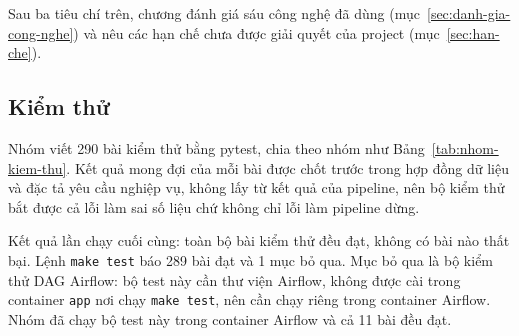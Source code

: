 Sau ba tiêu chí trên, chương đánh giá sáu công nghệ đã dùng (mục~\ref{sec:danh-gia-cong-nghe})
và nêu các hạn chế chưa được giải quyết của project (mục~\ref{sec:han-che}).

\subsection{Kiểm thử}
\label{sec:kiem-thu}

Nhóm viết 290 bài kiểm thử bằng pytest, chia theo nhóm như Bảng~\ref{tab:nhom-kiem-thu}. Kết quả
mong đợi của mỗi bài được chốt trước trong hợp đồng dữ liệu và đặc tả yêu cầu nghiệp vụ, không lấy từ kết
quả của pipeline, nên bộ kiểm thử bắt được cả lỗi làm sai số liệu chứ không chỉ lỗi làm pipeline
dừng.

Kết quả lần chạy cuối cùng: toàn bộ bài kiểm thử đều đạt, không có bài nào thất bại. Lệnh
\texttt{make test} báo 289 bài đạt và 1 mục bỏ qua. Mục bỏ qua là bộ kiểm thử DAG Airflow: bộ
test này cần thư viện Airflow, không được cài trong container \texttt{app} nơi chạy \texttt{make test},
nên cần chạy riêng trong container Airflow. Nhóm đã chạy bộ test này trong container Airflow và cả 11
bài đều đạt.

